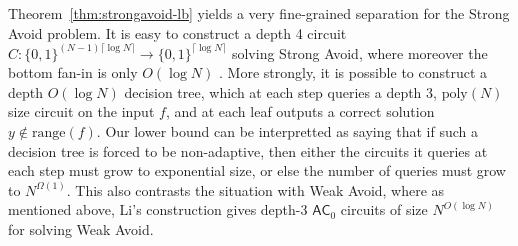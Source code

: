 \documentclass[11pt]{article}
\newtheorem{theorem}{Theorem}
\newcommand{\todo}[1]{\textcolor{red}{TODO: #1}}
\newcommand{\B}{\{0,1\}}
\newcommand{\rng}{\mathrm{range}}
\newcommand{\poly}{\mathrm{poly}}
\begin{document}




Theorem~\ref{thm:strongavoid-lb} yields a very fine-grained separation for the Strong Avoid problem. It is easy to construct a depth 4 circuit $C:\B^{(N-1)\lceil \log N \rceil} \to \B^{\lceil \log N \rceil}$ solving Strong Avoid, where moreover the bottom fan-in is only $O(\log N)$ \cite{vyas-williams}. More strongly, it is possible to construct a depth $O(\log N)$ decision tree, which at each step queries a depth 3, $\poly(N)$ size circuit on the input $f$, and at each leaf outputs a correct solution $y \notin \rng(f)$. Our lower bound can be interpretted as saying that if such a decision tree is forced to be non-adaptive, then either the circuits it queries at each step must grow to exponential size, or else the number of queries must grow to $N^{\Omega(1)}$. This also contrasts the situation with Weak Avoid, where as mentioned above,  Li's construction gives depth-3 $\mathsf{AC}_0$ circuits of size $N^{O(\log N)}$ for solving Weak Avoid.
\end{document}
